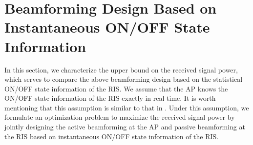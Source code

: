 \documentclass[draftclsnofoot,onecolumn,12pt]{IEEEtran}
\newcommand{\rev}[1]{{\color{red}#1}} %
\newcommand{\rev}[1]{#1}
\begin{document}
\section{Beamforming Design Based on Instantaneous ON/OFF State Information}\label{beamforming1}
In this section, we characterize the upper bound on the received signal power, which serves to compare the above beamforming design based on the statistical ON/OFF state information of the RIS. 
We assume that the AP knows the ON/OFF state information of the RIS exactly in real time. 
It is worth mentioning that this assumption is similar to that in \cite{Roy2019Beyond}. 
Under this assumption, we formulate an optimization problem to maximize the received signal power by jointly designing the active beamforming at the AP and passive beamforming at the RIS based on instantaneous ON/OFF state information of the RIS. 
\end{document}

